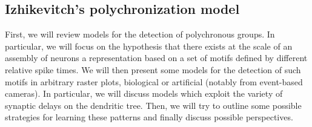 \documentclass[brainsci, %
               review,submit,pdftex,moreauthors%
               ]{Definitions/mdpi}
\begin{document}
\subsection{Izhikevitch's polychronization model}
First, we will review models for the detection of polychronous groups.
In particular, we will focus on the hypothesis that there exists at the scale of an assembly of neurons a representation based on a set of motifs defined by different relative spike times. %
We will then present some models for the detection of such motifs in arbitrary raster plots, biological or artificial (notably from event-based cameras). In particular, we will discuss models which exploit the variety of synaptic delays on the dendritic tree. Then, we will try to outline some possible strategies for learning these patterns and finally discuss possible perspectives.
%
%
\end{document}

